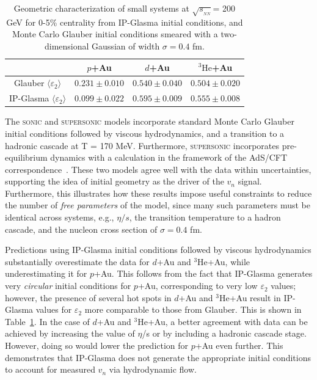 \documentclass[%
reprint,
showpacs,preprintnumbers,
 amsmath,amssymb,
 aps,
]{revtex4-1}
\newcommand{\sqsn}{\mbox{$\sqrt{s_{_{NN}}}$}\xspace}
\newcommand{\dau}{\mbox{$d$+Au}\xspace}
\newcommand{\pau}{\mbox{$p$+Au}\xspace}
\newcommand{\hau}{\mbox{$^3\text{He}$+Au}\xspace}
\begin{document}
\begin{table}
\caption{Geometric characterization of small systems at \sqsn = 200 GeV for 0-5\% centrality from IP-Glasma initial conditions, and Monte Carlo Glauber initial conditions smeared with a two-dimensional Gaussian of width $\sigma=0.4$ fm.}
\begin{ruledtabular}
\begin{tabular}{c c c c}
\label{table_geometry_glasma}
 & \pau & \dau & \hau \\ \hline
 Glauber $\langle \varepsilon_2 \rangle$ & $0.231\pm 0.010$ & $0.540\pm 0.040$ & $0.504\pm 0.020$ \\
 IP-Glasma $\langle \varepsilon_2 \rangle$ & $0.099\pm 0.022$ & $0.595\pm 0.009$ & $0.555\pm 0.008$ \\
\end{tabular}
\end{ruledtabular}
\end{table}

The \textsc{sonic} and \textsc{supersonic} models incorporate standard Monte Carlo Glauber initial conditions followed by viscous hydrodynamics, and a transition to a hadronic cascade at T = 170 MeV. Furthermore, \textsc{supersonic} incorporates pre-equilibrium dynamics with a calculation in the framework of the AdS/CFT correspondence~\cite{vanderSchee:2013pia,Chesler:2015wra,Romatschke:2013re}. These two models agree well with the data within uncertainties, supporting the idea of initial geometry as the driver of the $v_n$ signal. Furthermore, this illustrates how these results impose useful constraints to reduce the number of \emph{free parameters} of the model, since many such parameters must be identical across systems, e.g., $\eta/s$, the transition temperature to a hadron cascade, and the nucleon cross section of $\sigma=0.4$ fm.

Predictions using IP-Glasma initial conditions followed by viscous hydrodynamics substantially overestimate the data for \dau and \hau, while underestimating it for \pau. This follows from the fact that IP-Glasma generates very \emph{circular} initial conditions for \pau, corresponding to very low $\varepsilon_2$ values; however, the presence of several hot spots in \dau and \hau result in IP-Glasma values for $\varepsilon_2$ more comparable to those from Glauber. This is shown in Table~\ref{table_geometry_glasma}. In the case of \dau and \hau, a better agreement with data can be achieved by increasing the value of $\eta$/s or by including a hadronic cascade stage. However, doing so would lower the prediction for \pau even further. This demonstrates that IP-Glasma does not generate the appropriate initial conditions to account for measured $v_n$ via hydrodynamic flow. 
\end{document}
